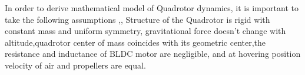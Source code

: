 
\bigskip

In order to derive mathematical model of Quadrotor dynamics, it is important to take the following assumptions \cite{doukhi2017intelligent},\cite{baoying2020research}, Structure of the Quadrotor is rigid with constant mass and uniform symmetry, gravitational force doesn’t change with altitude,quadrotor center of mass coincides with its geometric center,the resistance and inductance of BLDC motor are negligible, and at hovering position velocity of air and propellers are equal.


\noindent

